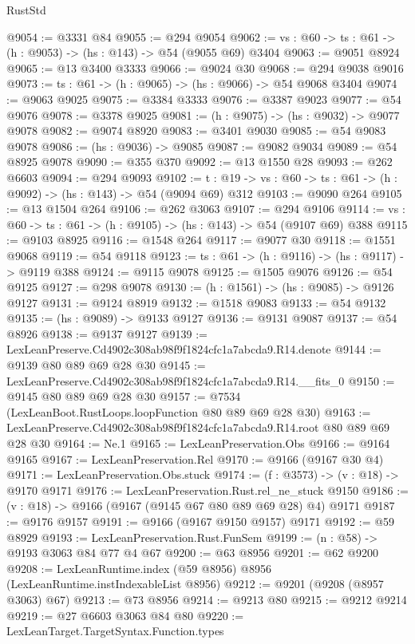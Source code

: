\begin{lexlean}{RustStd}
\begin{coremodule}
@9054 := @3331 @84
@9055 := @294 @9054
@9062 := {vs : @60} -> {ts : @61} -> (h : @9053) -> (hs : @143) -> @54 (@9055 @69) @3404
@9063 := @9051 @8924
@9065 := @13 @3400 @3333
@9066 := @9024 @30
@9068 := @294 @9038 @9016
@9073 := {ts : @61} -> (h : @9065) -> (hs : @9066) -> @54 @9068 @3404
@9074 := @9063 @9025
@9075 := @3384 @3333
@9076 := @3387 @9023
@9077 := @54 @9076
@9078 := @3378 @9025
@9081 := (h : @9075) -> (hs : @9032) -> @9077 @9078
@9082 := @9074 @8920
@9083 := @3401 @9030
@9085 := @54 @9083 @9078
@9086 := (hs : @9036) -> @9085
@9087 := @9082 @9034
@9089 := @54 @8925 @9078
@9090 := @355 @370
@9092 := @13 @1550 @28
@9093 := @262 @6603
@9094 := @294 @9093
@9102 := {t : @19} -> {vs : @60} -> {ts : @61} -> (h : @9092) -> (hs : @143) -> @54 (@9094 @69) @312
@9103 := @9090 @264
@9105 := @13 @1504 @264
@9106 := @262 @3063
@9107 := @294 @9106
@9114 := {vs : @60} -> {ts : @61} -> (h : @9105) -> (hs : @143) -> @54 (@9107 @69) @388
@9115 := @9103 @8925
@9116 := @1548 @264
@9117 := @9077 @30
@9118 := @1551 @9068
@9119 := @54 @9118
@9123 := {ts : @61} -> (h : @9116) -> (hs : @9117) -> @9119 @388
@9124 := @9115 @9078
@9125 := @1505 @9076
@9126 := @54 @9125
@9127 := @298 @9078
@9130 := (h : @1561) -> (hs : @9085) -> @9126 @9127
@9131 := @9124 @8919
@9132 := @1518 @9083
@9133 := @54 @9132
@9135 := (hs : @9089) -> @9133 @9127
@9136 := @9131 @9087
@9137 := @54 @8926
@9138 := @9137 @9127
@9139 := LexLeanPreserve.Cd4902c308ab98f9f1824cfc1a7abcda9.R14.denote
@9144 := @9139 @80 @89 @69 @28 @30
@9145 := LexLeanPreserve.Cd4902c308ab98f9f1824cfc1a7abcda9.R14.__fits_0
@9150 := @9145 @80 @89 @69 @28 @30
@9157 := @7534 (LexLeanBoot.RustLoops.loopFunction @80 @89 @69 @28 @30)
@9163 := LexLeanPreserve.Cd4902c308ab98f9f1824cfc1a7abcda9.R14.root @80 @89 @69 @28 @30
@9164 := Ne.{1}
@9165 := LexLeanPreservation.Obs
@9166 := @9164 @9165
@9167 := LexLeanPreservation.Rel
@9170 := @9166 (@9167 @30 @4)
@9171 := LexLeanPreservation.Obs.stuck
@9174 := (f : @3573) -> (v : @18) -> @9170 @9171
@9176 := LexLeanPreservation.Rust.rel_ne_stuck @9150
@9186 := (v : @18) -> @9166 (@9167 (@9145 @67 @80 @89 @69 @28) @4) @9171
@9187 := @9176 @9157
@9191 := @9166 (@9167 @9150 @9157) @9171
@9192 := @59 @8929
@9193 := LexLeanPreservation.Rust.FunSem
@9199 := (n : @58) -> @9193 @3063 @84 @77 @4 @67
@9200 := @63 @8956
@9201 := @62 @9200
@9208 := LexLeanRuntime.index (@59 @8956) @8956 (LexLeanRuntime.instIndexableList @8956)
@9212 := @9201 (@9208 (@8957 @3063) @67)
@9213 := @73 @8956
@9214 := @9213 @80
@9215 := @9212 @9214
@9219 := @27 @6603 @3063 @84 @80
@9220 := LexLeanTarget.TargetSyntax.Function.types

\end{coremodule}
\end{lexlean}
